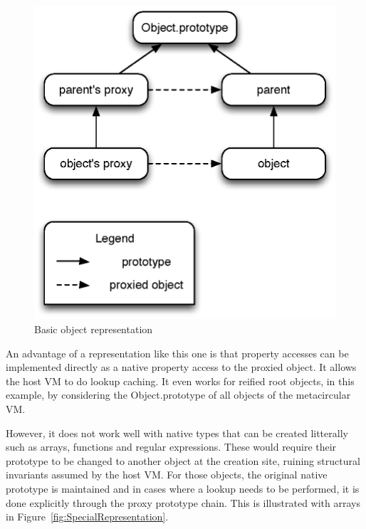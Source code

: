 \begin{figure}[htb]
\begin{center}
\includegraphics[scale=0.75]{figures/objectRepresentation}
\caption{\label{fig:BasicRepresentation} Basic object representation}
\end{center}
\end{figure}

An advantage of a representation like this one is that property accesses can be
implemented directly as a native property access to the proxied object. It
allows the host VM to do lookup caching. It even works for reified root
objects, in this example, by considering  the {Object.prototype} of
all objects of the metacircular VM.

However, it does not work well with native types that can be created litterally
such as arrays, functions and regular expressions. These would require their
prototype to be changed to another object at the creation site, ruining
structural invariants assumed by the host VM. For those objects, the original
native prototype is maintained and in cases where a lookup needs to be
performed, it is done explicitly through the proxy prototype chain. This is
illustrated with arrays in Figure~\ref{fig:SpecialRepresentation}.

